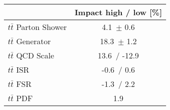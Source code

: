 \begin{tabular}{| l || c  |}
\hline
 & Impact high / low [\%] \tabularnewline
\hline
$t\bar{t}$ Parton Shower & 4.1\, $\pm$  0.6  \tabularnewline
$t\bar{t}$ Generator & 18.3\, $\pm$  1.2 \tabularnewline
$t\bar{t}$ QCD Scale & 13.6\, / -12.9 \tabularnewline
$t\bar{t}$ ISR & -0.6\, / 0.6 \tabularnewline
$t\bar{t}$ FSR & -1.3\, / 2.2 \tabularnewline
$t\bar{t}$ PDF & 1.9 \tabularnewline
\hline
\end{tabular}
